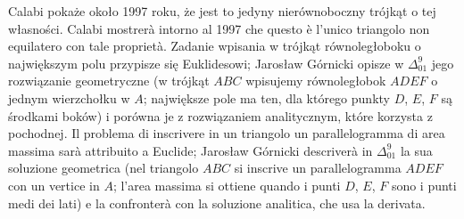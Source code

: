 Calabi pokaże około 1997 roku, że jest to jedyny nierównoboczny trójkąt o tej własności. %
Calabi mostrerà intorno al 1997 che questo è l'unico triangolo non equilatero con tale proprietà. %
Zadanie wpisania w trójkąt równoległoboku o największym polu przypisze się Euklidesowi; Jarosław Górnicki opisze w $\Delta_{01}^{9}$ jego rozwiązanie geometryczne (w trójkąt $ABC$ wpisujemy równoległobok $ADEF$ o jednym wierzchołku w $A$; największe pole ma ten, dla którego punkty $D$, $E$, $F$ są środkami boków) i porówna je z rozwiązaniem analitycznym, które korzysta z pochodnej. %
Il problema di inscrivere in un triangolo un parallelogramma di area massima sarà attribuito a Euclide; Jarosław Górnicki descriverà in $\Delta_{01}^{9}$ la sua soluzione geometrica (nel triangolo $ABC$ si inscrive un parallelogramma $ADEF$ con un vertice in $A$; l'area massima si ottiene quando i punti $D$, $E$, $F$ sono i punti medi dei lati) e la confronterà con la soluzione analitica, che usa la derivata. %

%